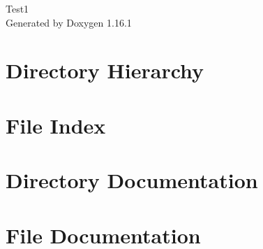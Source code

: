 \documentclass[twoside]{book}
\newcommand{\+}{\discretionary{\mbox{\scriptsize$\hookleftarrow$}}{}{}}
\newcommand{\clearemptydoublepage}{%
    \newpage{\pagestyle{empty}\cleardoublepage}%
  }
\begin{document}
  \raggedbottom
  \begin{titlepage}
  \vspace*{7cm}
  \begin{center}%
  {\Large Test1}\\
  \vspace*{1cm}
  {\large Generated by Doxygen 1.16.1}\\
  \end{center}
  \end{titlepage}
  \clearemptydoublepage
  \tableofcontents
  \clearemptydoublepage
\chapter{Directory Hierarchy}

\chapter{File Index}

\chapter{Directory Documentation}








\chapter{File Documentation}


  \backmatter
  \newpage
  \clearemptydoublepage
  \printindex
\end{document}
